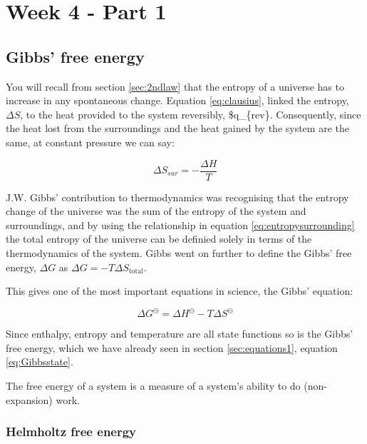 \documentclass[
]{book}
\begin{document}
\hypertarget{ch:Part7}{%
\chapter{Week 4 - Part 1}\label{ch:Part7}}

\hypertarget{gibbs-free-energy}{%
\section{Gibbs' free energy}\label{gibbs-free-energy}}

You will recall from section \ref{sec:2ndlaw} that the entropy of a universe has to increase in any spontaneous change. Equation \eqref{eq:clausius}, linked the entropy, \(\Delta S\), to the heat provided to the system reversibly, \$q\_\{\textrm{rev}\}. Consequently, since the heat lost from the surroundings and the heat gained by the system are the same, at constant pressure we can say:

\begin{equation}
\Delta S_{sur}=-\frac {\Delta H}{T}
\label{eq:entropysurrounding}
\end{equation}

J.W. Gibbs' contribution to thermodynamics was recognising that the entropy change of the universe was the sum of the entropy of the system and surroundings, and by using the relationship in equation \eqref{eq:entropysurrounding} the total entropy of the universe can be definied solely in terms of the thermodynamics of the system. Gibbs went on further to define the Gibbs' free energy, \(\Delta G\) as \(\Delta G = - T\Delta S_{\textrm{total}}\).

This gives one of the most important equations in science, the Gibbs' equation:

\begin{equation}
\Delta G^\ominus = \Delta H^\ominus - T \Delta S^\ominus
\label{eq:Gibbs}
\end{equation}

Since enthalpy, entropy and temperature are all state functions so is the Gibbs' free energy, which we have already seen in section \ref{sec:equations1}, equation \eqref{eq:Gibbsstate}.

The free energy of a system is a measure of a system's ability to do (non-expansion) work.

\hypertarget{helmholtz-free-energy}{%
\subsection{Helmholtz free energy}\label{helmholtz-free-energy}}
\end{document}
